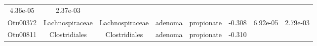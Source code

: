 \documentclass[11pt,]{article}
\begin{document}
\begin{longtable}[]{@{}cccccccc@{}}
\begin{minipage}[t]{0.08\columnwidth}
4.36e-05\strut
\end{minipage} & \begin{minipage}[t]{0.08\columnwidth}\centering\strut
2.37e-03\strut
\end{minipage}\tabularnewline
\begin{minipage}[t]{0.08\columnwidth}\centering\strut
Otu00372\strut
\end{minipage} & \begin{minipage}[t]{0.15\columnwidth}\centering\strut
Lachnospiraceae\strut
\end{minipage} & \begin{minipage}[t]{0.15\columnwidth}\centering\strut
Lachnospiraceae\strut
\end{minipage} & \begin{minipage}[t]{0.08\columnwidth}\centering\strut
adenoma\strut
\end{minipage} & \begin{minipage}[t]{0.09\columnwidth}\centering\strut
propionate\strut
\end{minipage} & \begin{minipage}[t]{0.07\columnwidth}\centering\strut
-0.308\strut
\end{minipage} & \begin{minipage}[t]{0.08\columnwidth}\centering\strut
6.92e-05\strut
\end{minipage} & \begin{minipage}[t]{0.08\columnwidth}\centering\strut
2.79e-03\strut
\end{minipage}\tabularnewline
\begin{minipage}[t]{0.08\columnwidth}\centering\strut
Otu00811\strut
\end{minipage} & \begin{minipage}[t]{0.15\columnwidth}\centering\strut
Clostridiales\strut
\end{minipage} & \begin{minipage}[t]{0.15\columnwidth}\centering\strut
Clostridiales\strut
\end{minipage} & \begin{minipage}[t]{0.08\columnwidth}\centering\strut
adenoma\strut
\end{minipage} & \begin{minipage}[t]{0.09\columnwidth}\centering\strut
propionate\strut
\end{minipage} & \begin{minipage}[t]{0.07\columnwidth}\centering\strut
-0.310\strut
\end{minipage} & \begin{minipage}[t]{0.08\columnwidth}\centering\strut

\end{minipage}
\end{longtable}
\end{document}
